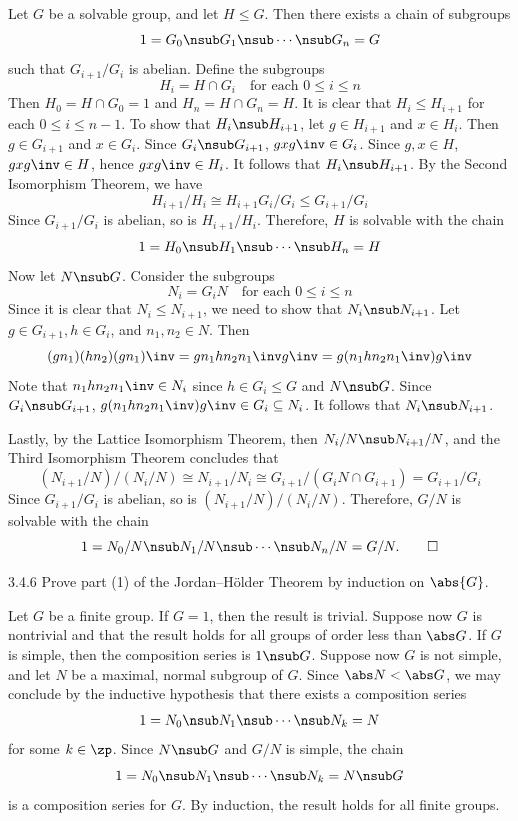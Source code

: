 \begin{sol}
    Let $G$ be a solvable group, and let $H \leq G$.
	Then there exists a chain of subgroups
    \[
    	1 = G_0 \nsub G_1 \nsub \cdots \nsub G_n = G
    \]
    such that $G_{i + 1}/G_i$ is abelian.
	Define the subgroups
    \[
    	H_i = H \cap G_i \quad \text{for each $0 \leq i \leq n$}
    \]
    Then $H_0 = H \cap G_0 = 1$ and $H_n = H \cap G_n = H$.
	It is clear that $H_i \leq H_{i + 1}$ for each $0 \leq i \leq n - 1$.
	To show that $H_i \nsub H_{i + 1}$, let $g \in H_{i + 1}$ and $x \in H_i$.
	Then $g \in G_{i + 1}$ and $x \in G_i$.
	Since $G_i \nsub G_{i + 1}$, $gxg\inv \in G_i$.
	Since $g, x \in H$, $gxg\inv \in H$, hence $gxg\inv \in H_i$.
	It follows that $H_i \nsub H_{i + 1}$.
	By the Second Isomorphism Theorem, we have
    \[
    	H_{i + 1}/H_i \cong H_{i + 1}G_i/G_i \leq G_{i + 1}/G_i
    \]
    Since $G_{i + 1}/G_i$ is abelian, so is $H_{i + 1}/H_i$.
	Therefore, $H$ is solvable with the chain
    \[
    	1 = H_0 \nsub H_1 \nsub \cdots \nsub H_n = H
    \]
    Now let $N \nsub G$.
	Consider the subgroups
    \[
    	N_i = G_iN \quad \text{for each $0 \leq i \leq n$}
    \]
    Since it is clear that $N_i \leq N_{i + 1}$, we need to show that $N_i \nsub N_{i + 1}$.
	Let $g \in G_{i + 1}, h \in G_i$, and $n_1, n_2 \in N$.
	Then
    \[
    	(gn_1)(hn_2)(gn_1)\inv = g n_1 h n_2 n_1\inv g\inv = g(n_1 h n_2 n_1\inv)g \inv
    \]
    Note that $n_1 hn_2n_1\inv \in N_i$ since $h \in G_i \leq G$ and $N \nsub G$.
	Since $G_i \nsub G_{i + 1}$, $g(n_1 h n_2 n_1\inv)g \inv \in G_i \subseteq N_i$.
	It follows that $N_i \nsub N_{i + 1}$.

    Lastly, by the Lattice Isomorphism Theorem, then $N_i/N \nsub N_{i + 1}/N$, and the Third Isomorphism Theorem concludes that
    \[
    	(N_{i + 1}/N)/(N_i/N) \cong N_{i + 1}/N_i \cong G_{i + 1}/(G_iN \cap G_{i + 1}) = G_{i + 1}/G_i
    \]
    Since $G_{i + 1}/G_i$ is abelian, so is $(N_{i + 1}/N)/(N_i/N)$.
	Therefore, $G/N$ is solvable with the chain
    \[
    	1 = N_0/N \nsub N_1/N \nsub \cdots \nsub N_n/N = G/N. \qedhere
    \]
\end{sol}

\begin{exercise}{3.4.6}
    Prove part (1) of the Jordan--H\"older Theorem by induction on $\abs{G}$.
\end{exercise}

\begin{sol}
    Let $G$ be a finite group.
	If $G = 1$, then the result is trivial.
	Suppose now $G$ is nontrivial and that the result holds for all groups of order less than $\abs G$.
	If $G$ is simple, then the composition series is $1 \nsub G$.
	Suppose now $G$ is not simple, and let $N$ be a maximal, normal subgroup of $G$.
	Since $\abs N < \abs G$, we may conclude by the inductive hypothesis that there exists a composition series
    \[
    	1 = N_0 \nsub N_1 \nsub \cdots \nsub N_k = N
    \]
    for some $k \in \zp$.
	Since $N \nsub G$ and $G/N$ is simple, the chain
    \[
    	1 = N_0 \nsub N_1 \nsub \cdots \nsub N_k = N \nsub G
    \]
    is a composition series for $G$.
	By induction, the result holds for all finite groups.
\end{sol}


